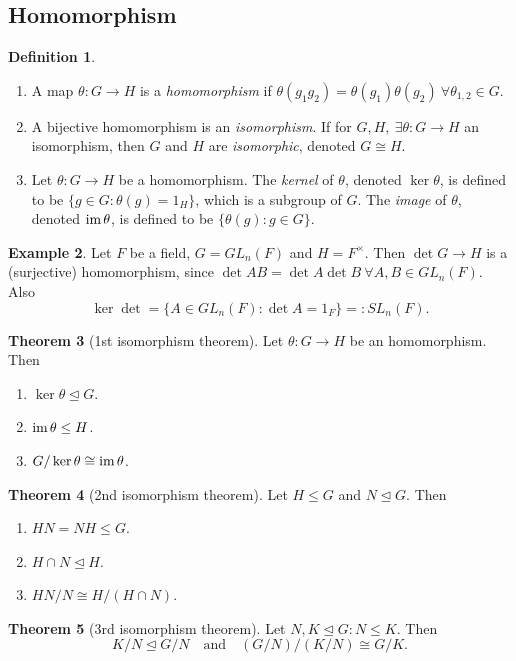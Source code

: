 \documentclass[a4paper]{article}
\newcommand{\im}{\text{im\,}}
\theoremstyle{definition}
\newtheorem{defn}{Definition}[subsection]
\newtheorem{thm}[defn]{Theorem}
\newtheorem{example}[defn]{Example}
\begin{document}
\subsection{Homomorphism}
\begin{defn}
\begin{enumerate}
\item A map $\theta:G\rightarrow H$ is a \textit{homomorphism} if $\theta(g_1g_2)=\theta(g_1)\theta(g_2) \ \forall \theta_{1,2}\in G$.
\item A bijective homomorphism is an \textit{isomorphism}. If for $G,H,\ \exists\theta:G\rightarrow H$ an isomorphism, then $G$ and $H$ are \textit{isomorphic}, denoted $G\cong H$.
\item Let $\theta:G\rightarrow H$ be a homomorphism. The \textit{kernel} of $\theta$, denoted $\ker \theta$, is defined to be $\{g\in G:\theta (g)=1_H\}$, which is a subgroup of $G$. The \textit{image} of $\theta$, denoted $\im \theta$, is defined to be $\{\theta(g):g\in G\}$.
\end{enumerate}
\end{defn}
\begin{example}
Let $F$ be a field, $G=GL_n(F)$ and $H=F^\times$. Then $\det G\rightarrow H$ is a (surjective) homomorphism, since $\det AB=\det A\det B \ \forall A,B\in GL_n(F)$. Also
\[
\ker \det = \{A\in GL_n(F):\det A=1_F\}=: SL_n(F).
\]
\end{example}

\begin{thm}[1st isomorphism theorem]
Let $\theta:G\rightarrow H$ be an homomorphism. Then
\begin{enumerate}
\item $\ker\theta\unlhd G$.
\item $\im \theta\leq H$.
\item $G/\ker\theta\cong\im\theta$.
\end{enumerate}
\end{thm}

\begin{thm}[2nd isomorphism theorem]
\label{thm:2ndiso}
Let $H\leq G$ and $N\unlhd G$. Then
\begin{enumerate}
\item $HN=NH\leq G$.
\item $H\cap N\unlhd H$.
\item $HN/N\cong H/(H\cap N)$.
\end{enumerate}
\end{thm}

\begin{thm}[3rd isomorphism theorem]
\label{thm:3rdiso}
Let $N,K\unlhd G : N\leq K$. Then
\[
K/N \unlhd G/N \quad \text{and} \quad (G/N)/(K/N)\cong G/K.
\]
\end{thm}
\end{document}
